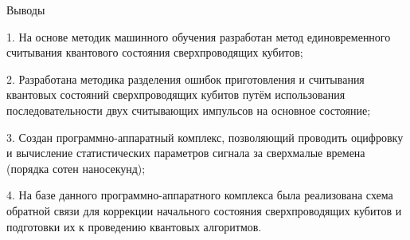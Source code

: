 \begin{center}
	\large Выводы
\end{center}


1. На основе методик машинного обучения разработан метод единовременного считывания квантового состояния сверхпроводящих кубитов; 

2. Разработана методика разделения ошибок приготовления и считывания квантовых состояний сверхпроводящих кубитов путём использования последовательности двух считывающих импульсов на основное состояние;

3. Создан программно-аппаратный комплекс, позволяющий проводить оцифровку и вычисление статистических параметров сигнала за сверхмалые времена (порядка сотен наносекунд);

4. На базе данного программно-аппаратного комплекса была реализована схема обратной связи для коррекции начального состояния сверхпроводящих кубитов и подготовки их к проведению квантовых алгоритмов.
